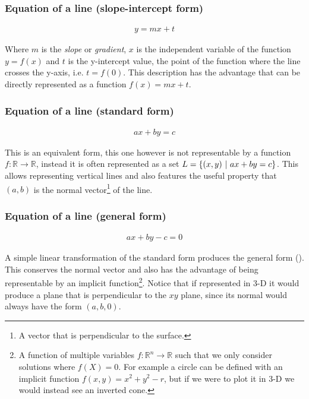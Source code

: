 \subsubsection*{Equation of a line (slope-intercept form)}
\begin{align}
    y = mx + t
\end{align}

Where $m$ is the \emph{slope} or \emph{gradient}, $x$ is the independent variable of the function $y = f(x)$ and $t$ is the y-intercept value, the point of the function where the line crosses the y-axis, i.e. $t = f(0)$. This description has the advantage that can be directly represented as a function $f(x) = mx + t$.

\subsubsection*{Equation of a line (standard form)}
\begin{align}
    ax + by = c
\end{align}

This is an equivalent form, this one however is not representable by a function $f: \mathbb{R} \rightarrow \mathbb{R}$, instead it is often represented as a set $L = \{(x, y) \ |\  ax + by = c\}$. This allows representing vertical lines and also features the useful property that $(a, b)$ is the normal vector\footnote{A vector that is perpendicular to the surface.} of the line.

\subsubsection*{Equation of a line (general form)}
\begin{align}
    ax + by - c = 0
\end{align}

A simple linear transformation of the standard form produces the general form (\cite{noauthor_wikipedia_2021}). This conserves the normal vector and also has the advantage of being representable by an implicit function\footnote{A function of multiple variables $f: \mathbb{R}^n \rightarrow \mathbb{R}$ such that we only consider solutions where $f(X) = 0$. For example a circle can be defined with an implicit function $f(x, y) = x^2 + y^2 - r$, but if we were to plot it in 3-D we would instead see an inverted cone.}. Notice that if represented in 3-D it would produce a plane that is perpendicular to the $xy$ plane, since its normal would always have the form $(a, b, 0)$.

